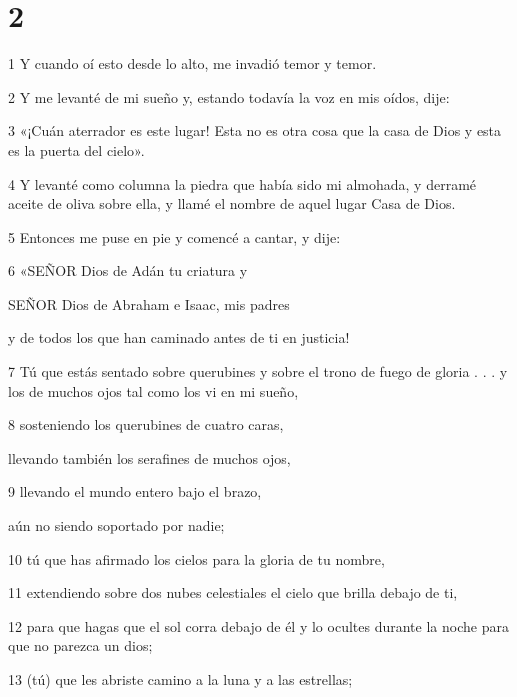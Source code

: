 \chapter{2}

\par 1 Y cuando oí esto desde lo alto, me invadió temor y temor.

\par 2 Y me levanté de mi sueño y, estando todavía la voz en mis oídos, dije:

\par 3 «¡Cuán aterrador es este lugar! Esta no es otra cosa que la casa de Dios y esta es la puerta del cielo».

\par 4 Y levanté como columna la piedra que había sido mi almohada, y derramé aceite de oliva sobre ella, y llamé el nombre de aquel lugar Casa de Dios.

\par 5 Entonces me puse en pie y comencé a cantar, y dije:

\par 6 «SEÑOR Dios de Adán tu criatura y
\par SEÑOR Dios de Abraham e Isaac, mis padres
\par y de todos los que han caminado antes de ti en justicia!

\par 7 Tú que estás sentado sobre querubines y sobre el trono de fuego de gloria
. . . y los de muchos ojos tal como los vi en mi sueño,


\par 8 sosteniendo los querubines de cuatro caras,
\par llevando también los serafines de muchos ojos,

\par 9 llevando el mundo entero bajo el brazo,
\par aún no siendo soportado por nadie;

\par 10 tú que has afirmado los cielos para la gloria de tu nombre,

\par 11 extendiendo sobre dos nubes celestiales el cielo que brilla debajo de ti,

\par 12 para que hagas que el sol corra debajo de él y lo ocultes durante la noche para que no parezca un dios;

\par 13 (tú) que les abriste camino a la luna y a las estrellas;

